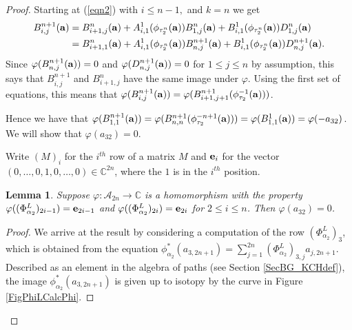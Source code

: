 \documentclass[11pt]{amsart}
\newcommand{\al}[1]{\begin{align*}#1\end{align*}}
\newtheorem{lem}[thm]{Lemma}
\theoremstyle{definition}
\begin{document}
\begin{proof}
Starting at (\ref{eqn2}) with $i\le n-1,$ and $k=n$ we get
  \al{
    B_{i,j}^{n+1}({\bf a})  
      &= B_{i+1,j}^n({\bf a}) + A_{i,1}^1(\phi_{\tau_2^n}({\bf a}))B_{1,j}^n({\bf a})+B_{i,1}^1(\phi_{\tau_2^n}({\bf a}))D_{1,j}^n({\bf a}) \\
      &= B_{i+1,1}^n({\bf a}) + A_{i,1}^1(\phi_{\tau_2^n}({\bf a}))B_{n,j}^{n+1}({\bf a})+B_{i,1}^1(\phi_{\tau_2^n}({\bf a}))D_{n,j}^{n+1}({\bf a}).
  }
  Since $\varphi(B_{n,j}^{n+1}({\bf a}))=0$ and $\varphi(D_{n,j}^{n+1}({\bf a}))=0$ for $1\le j\le n$ by assumption, this says that $B_{i,j}^{n+1}$ and $B_{i+1,j}^n$ have the same image under $\varphi$. Using the first set of equations, this means that $\varphi(B_{i,j}^{n+1}({\bf a}))=\varphi(B_{i+1,j+1}^{n+1}(\phi_{\tau_2}^{-1}({\bf a})))$.

  Hence we have that $\varphi(B_{1,1}^{n+1}({\bf a})) = \varphi(B_{n,n}^{n+1}(\phi_{\tau_2}^{-n+1}({\bf a}))) = \varphi(B_{1,1}^1({\bf a})) = \varphi(-a_{32})$. We will show that $\varphi(a_{32}) = 0$.

Write $(M)_i$ for the $i^{th}$ row of a matrix $M$ and ${\bf e}_i$ for the vector $(0,\ldots,0,1,0,\ldots,0)\in\mathbb C^{2n}$, where the $1$ is in the $i^{th}$ position.

\begin{lem}Suppose $\varphi:\mathcal A_{2n}\to \mathbb C$ is a homomorphism with the property $\varphi((\Phi_{\alpha_2}^L)_{2i-1})={\bf e}_{2i-1}$ and $\varphi((\Phi_{\alpha_2}^L)_{2i})={\bf e}_{2i}$ for $2\le i\le n$. Then $\varphi(a_{32}) = 0$.
\label{LemZeroness}
\end{lem}
\begin{proof}We arrive at the result by considering a computation of the row $(\Phi_{\alpha_2}^L)_3$, which is obtained from the equation $\phi_{\alpha_2}^{\ast}(a_{3,2n+1}) = \sum_{j=1}^{2n}(\Phi_{\alpha_2}^L)_{3,j}a_{j,2n+1}$. Described as an element in the algebra of paths (see Section \ref{SecBG_KCHdef}), the image $\phi_{\alpha_2}^{\ast}(a_{3,2n+1})$ is given up to isotopy by the curve in Figure \ref{FigPhiLCalcPhi}.


\end{proof}
\end{proof}
\end{document}
